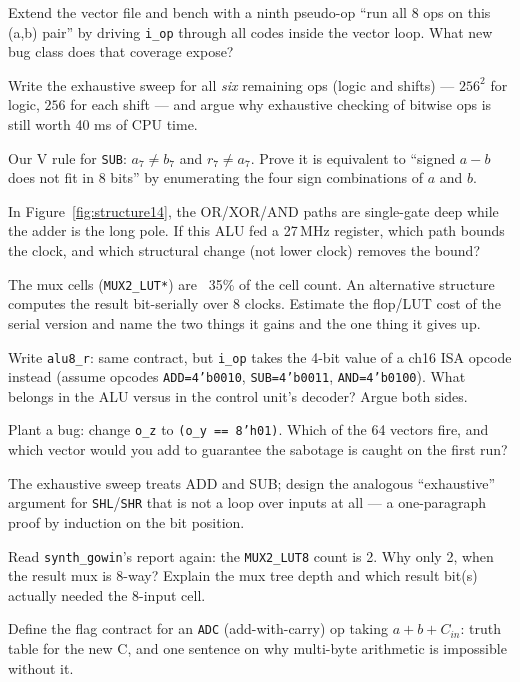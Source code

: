 \begin{exercise}[hard]
Extend the vector file and bench with a ninth pseudo-op ``run all 8
ops on this (a,b) pair'' by driving \texttt{i\_op} through all codes
inside the vector loop. What new bug class does that coverage expose?
\end{exercise}
\begin{exercise}[hard]
Write the exhaustive sweep for all \emph{six} remaining ops (logic and
shifts) --- $256^2$ for logic, $256$ for each shift --- and argue why
exhaustive checking of bitwise ops is still worth 40 ms of CPU time.
\end{exercise}
\begin{exercise}[hard]
Our V rule for \texttt{SUB}: $a_7\neq b_7$ and $r_7\neq a_7$. Prove
it is equivalent to ``signed $a-b$ does not fit in 8 bits'' by
enumerating the four sign combinations of $a$ and $b$.
\end{exercise}
\begin{exercise}[hard]
In Figure~\ref{fig:structure14}, the OR/XOR/AND paths are single-gate
deep while the adder is the long pole. If this ALU fed a 27\,MHz
register, which path bounds the clock, and which structural change
(not lower clock) removes the bound?
\end{exercise}
\begin{exercise}[hard]
The mux cells (\texttt{MUX2\_LUT*}) are ~35\% of the cell count.
An alternative structure computes the result bit-serially over 8
clocks. Estimate the flop/LUT cost of the serial version and name the
two things it gains and the one thing it gives up.
\end{exercise}
\begin{exercise}[hard]
Write \texttt{alu8\_r}: same contract, but \texttt{i\_op} takes the
4-bit value of a ch16 ISA opcode instead (assume opcodes
\texttt{ADD=4'b0010}, \texttt{SUB=4'b0011}, \texttt{AND=4'b0100}). What
belongs in the ALU versus in the control unit's decoder? Argue both
sides.
\end{exercise}
\begin{exercise}[hard]
Plant a bug: change \texttt{o\_z} to \texttt{(o\_y == 8'h01)}. Which
of the 64 vectors fire, and which vector would you add to guarantee
the sabotage is caught on the first run?
\end{exercise}
\begin{exercise}[hard]
The exhaustive sweep treats ADD and SUB; design the analogous
``exhaustive'' argument for \texttt{SHL}/\texttt{SHR} that is not a
loop over inputs at all --- a one-paragraph proof by induction on the
bit position.
\end{exercise}
\begin{exercise}[hard]
Read \texttt{synth\_gowin}'s report again: the \texttt{MUX2\_LUT8}
count is 2. Why only 2, when the result mux is 8-way? Explain the mux
tree depth and which result bit(s) actually needed the 8-input cell.
\end{exercise}
\begin{exercise}[hard]
Define the flag contract for an \texttt{ADC} (add-with-carry) op
taking $a+b+C_{in}$: truth table for the new C, and one sentence on
why multi-byte arithmetic is impossible without it.
\end{exercise}

